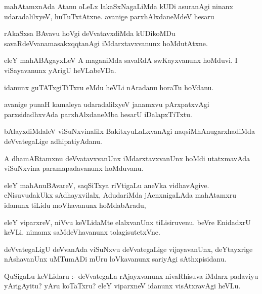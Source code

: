 \documentclass{article}
\begin{document}
\begin{mn}
mahAtamxnAda Atanu oLeLx lakaSxNagaLiMda kUDi asuranAgi ninanx udaradalilxyeV, 
huTuTxtAtxne. avanige parxhAlxdaneMdeV hesaru
\end{mn}

\begin{mn}
rAkaSxsa BAvavu hoVgi deVvatavxdiMda kUDikoMDu savaRdeVvanamasakxqqtanAgi 
iMdarxtavxvanunx hoMdutAtxne.
\end{mn}

\begin{mn}
eleY mahABAgayxLeV A maganiMda savaRdA swKayxvanunx hoMduvi. I viSayavanunx 
yArigU  heVLabeVDa.
\end{mn}

\begin{mn}
idanunx guTATxgiTiTxru eMdu heVLi nAradanu horaTu hoVdanu.
\end{mn}

\begin{mn}
avanige punaH kamaleya udaradalilxyeV janamxvu pArxpatxvAgi parxsidadhxvAda
parxhAlxdaneMba hesarU iDalapxTiTxtu.
\end{mn}

\begin{mn}
bAlayxdiMdaleV viSuNxvinalilx BakitxyuLaLxvanAgi naqsiMhAnugarxhadiMda
deVvategaLige adhipatiyAdanu.
\end{mn}

\begin{mn}
A dhamARtamxnu deVvatavxvanUnx iMdarxtavxvanUnx hoMdi utatxmavAda 
viSuNxvina paramapadavanunx hoMduvanu.
\end{mn}

\begin{mn}
eleY mahAnuBAvareV, saqSiTxya riVtigaLu aneVka vidhavAgive. eNisuvudakUkx 
sAdhayxvilalx, AdudariMda jAcnxnigaLAda mahAtamxru idanunx tiLidu 
moVhavanunx hoMdabAradu,
\end{mn}

\begin{mn}
eleY viparxreV, niVvu keVLidaMte elalxvanUnx tiLisiruvenu. beVre EnidadxrU 
keVLi. nimamx saMdeVhavanunx tolagisutetxVne.
\end{mn}

\begin{mn}
deVvategaLigU deVvanAda viSuNxvu deVvategaLige vijayavanUnx, deYtayxrige 
nAshavanUnx  uMTumADi mUru loVkavanunx sariyAgi sAthxpisidanu.
\end{mn}

\begin{mn}
QuSigaLu keVLidaru :- deVvategaLa rAjayxvanunx nivaRhisuva iMdarx padaviyu 
yArigAyitu? yAru koTaTxru? eleY viparxneV idanunx visAtxravAgi heVLu. 
\end{mn}
\end{document}
